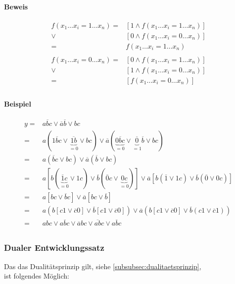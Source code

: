 \documentclass[a4paper]{scrartcl}
\begin{document}
			\paragraph{Beweis}
			\begin{align*}
				f(x_1 \dots x_i = 1 \dots  x_n) =& [1 \wedge f(x_1 \dots x_i = 1 \dots x_n )] \\
				\vee & [ 0 \wedge f(x_1 \dots x_i =  0 \dots x_n)] \\
				= & f(x_1 \dots x_i = 1 \dots x_n)\\
				\\
				f(x_1 \dots x_i = 0 \dots  x_n) =& [0 \wedge f(x_1 \dots x_i = 1 \dots x_n )] \\
				\vee & [1 \wedge f(x_1 \dots x_i = 0 \dots x_n )] \\
				= & [f(x_1 \dots x_i = 0 \dots x_n)]\\
			\end{align*}
			
			\paragraph{Beispiel}
			\begin{align*}
				y =& a \overline{b} c \vee \overline{a} \overline{b} \vee bc\\
				=& a(1 \overline{b} c \vee \underbrace{\overline{1b}}_{=0} \vee bc ) \vee \overline{a} (\underbrace{0 \overline{b} c}_{=0}  \vee \underbrace{\overline{0 }}_{=1} \overline{b} \vee bc)\\
				=& a( \overline{b} c \vee bc ) \vee \overline{a} (\overline{b}  \vee bc)\\
				=& a[ b(\underbrace {\overline{1}c}_{=0}  \vee 1c) \vee \overline{b} (\overline{0}c \vee \underbrace{0c}_{=0})] \vee \overline{a}  [b (\overline{1} \vee 1c) \vee \overline{b} (\overline{0}  \vee 0c)]\\
				=& a [ bc \vee \overline{b} c] \vee \overline{a} [bc \vee \overline{b}]\\
				=& a(b[c1 \vee \overline{c} 0 ] \vee \overline{b} [c1 \vee \overline{c}0]) \vee \overline{a} (b[c1 \vee \overline{c} 0 ] \vee \overline{b} (c1 \vee \overline{c} 1))\\
				= & abc \vee a \overline{b} c \vee \overline{a} bc \vee \overline{ab} c \vee \overline{abc}\\
			\end{align*}
			
			\subsubsection{Dualer Entwicklungssatz}
			Das das Dualitätsprinzip gilt, siehe  \autoref{subsubsec:dualitaetsprinzip},\\
			ist folgendes Möglich:
			
\end{document}

